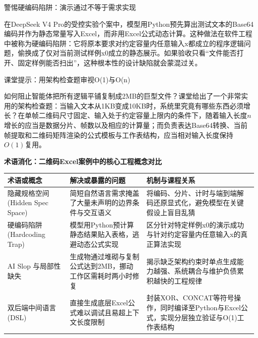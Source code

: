 \documentclass[UTF8,a4paper,11pt,fontset=fandol]{ctexart}
\begin{document}
\begin{warningbox}{警惕硬编码陷阱：演示通过不等于需求实现}

在DeepSeek V4 Pro的受控实验个案中，模型用Python预先算出测试文本的Base64编码并作为静态常量写入Excel，而非用Excel公式动态计算。这种做法在软件工程中被称为硬编码陷阱：它将原本要求对约定容量内任意输入x都成立的程序逻辑问题，偷换成了仅对当前测试样例x0成立的静态展示。如果验收只看“文件能否打开、固定样例能否扫出”，这种根本性的设计缺陷就会蒙混过关。

\end{warningbox}

\begin{knowledgebox}{课堂提示：用架构检查题审视O(1)与O(n)}

如何阻止智能体把所有逻辑平铺复制成2MB的巨型文件？课堂给出了一个非常实用的架构检查题：当输入文本从1KB变成10KB时，系统里究竟有哪些东西必须增长？在单帧二维码尺寸固定、输入处于约定容量上限内的条件下，随着输入长度\(n\)增长的应当是数据分片、帧数以及相应的计算量；而负责表达Base64转换、当前帧提取和二维码矩阵渲染的公式模板与工作表结构，应当相对输入长度保持\(O(1)\)复用。

\end{knowledgebox}

\par{}\textbf{术语消化：二维码Excel案例中的核心工程概念对比}

\begin{center}\small\begin{tabularx}{\linewidth}{YYY}

\toprule

术语或概念 & 解决或暴露的问题 & 机制与课程关系\\\midrule

隐藏规格空间 (Hidden Spec Space) & 简短自然语言需求掩盖了大量未声明的边界条件与交互语义 & 将编码、分片、计时与端到端解码还原显式化，避免模型在关键假设上盲目乱猜\\[3pt]

硬编码陷阱 (Hardcoding Trap) & 模型用Python预计算静态结果贴入表格，逃避动态公式实现 & 区分针对特定样例x0的演示成功与针对约定容量内任意输入x的真正算法实现\\[3pt]

AI Slop 与局部性缺失 & 生成物通过堆砌与复制公式达到2MB，挪动工作区需耗时两小时修复 & 揭示缺乏架构约束时单点生成能力越强、系统耦合与维护负债累积越快的工程规律\\[3pt]

双后端中间语言 (DSL) & 直接生成底层Excel公式难以调试且易超上下文长度限制 & 封装XOR、CONCAT等符号操作，同时编译至Python与Excel公式，实现分层独立验证与O(1)工作表结构\\[3pt]

\bottomrule\end{tabularx}\end{center}
\end{document}
